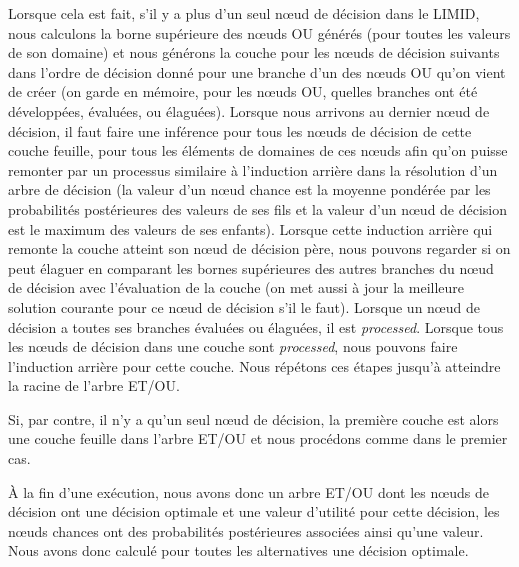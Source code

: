 \documentclass[12pt]{article}
\begin{document}
Lorsque cela est fait, s'il y a plus d'un seul nœud de décision dans le LIMID, nous calculons la borne supérieure des nœuds OU générés (pour toutes les valeurs de son domaine) et nous générons la couche pour les nœuds de décision suivants dans l'ordre de décision donné pour une branche d'un des nœuds OU qu'on vient de créer (on garde en mémoire, pour les nœuds OU, quelles branches ont été développées, évaluées, ou élaguées). Lorsque nous arrivons au dernier nœud de décision, il faut faire une inférence pour tous les nœuds de décision de cette couche feuille, pour tous les éléments de domaines de ces nœuds afin qu'on puisse remonter par un processus similaire à l'induction arrière dans la résolution d'un arbre de décision (la valeur d'un nœud chance est la moyenne pondérée par les probabilités postérieures des valeurs de ses fils et la valeur d'un nœud de décision est le maximum des valeurs de ses enfants). Lorsque cette induction arrière qui remonte la couche atteint son nœud de décision père, nous pouvons regarder si on peut élaguer en comparant les bornes supérieures des autres branches du nœud de décision avec l'évaluation de la couche (on met aussi à jour la meilleure solution courante pour ce nœud de décision s'il le faut). Lorsque un nœud de décision a toutes ses branches évaluées ou élaguées, il est \textit{processed}. Lorsque tous les nœuds de décision dans une couche sont \textit{processed}, nous pouvons faire l'induction arrière pour cette couche. Nous répétons ces étapes jusqu'à atteindre la racine de l'arbre ET/OU. 

Si, par contre, il n'y a qu'un seul nœud de décision, la première couche est alors une couche feuille dans l'arbre ET/OU et nous procédons comme dans le premier cas.

À la fin d'une exécution, nous avons donc un arbre ET/OU dont les nœuds de décision ont une décision optimale et une valeur d'utilité pour cette décision, les nœuds chances ont des probabilités postérieures associées ainsi qu'une valeur. Nous avons donc calculé pour toutes les alternatives une décision optimale.
\end{document}
